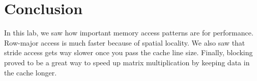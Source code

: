 \documentclass{article}
\begin{document}
\section{Conclusion}
In this lab, we saw how important memory access patterns are for performance. Row-major access is much faster because of spatial locality. We also saw that stride access gets way slower once you pass the cache line size. Finally, blocking proved to be a great way to speed up matrix multiplication by keeping data in the cache longer.
\end{document}

